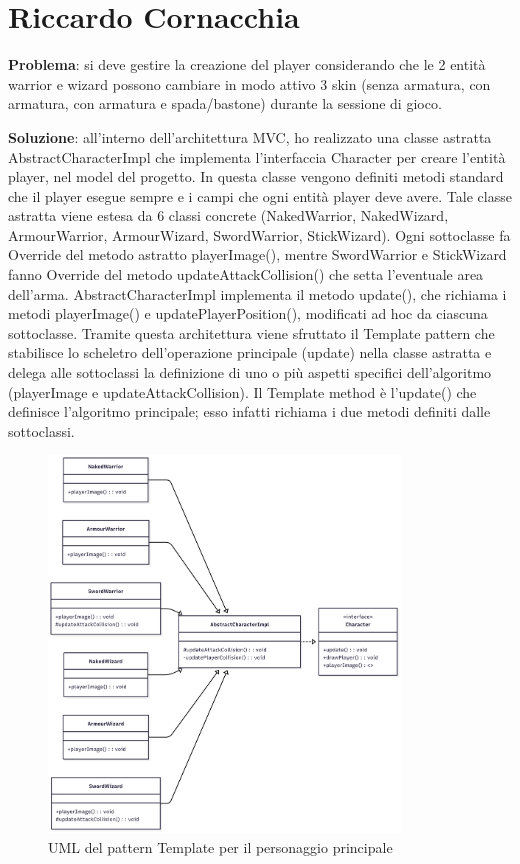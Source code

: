 \documentclass[a4paper,12pt]{report}
\begin{document}
\section{Riccardo Cornacchia}

\textbf{Problema}: si deve gestire la creazione del player considerando che le 2 entità warrior e wizard possono cambiare in modo attivo 3 skin
(senza armatura, con armatura, con armatura e spada/bastone) durante la sessione di gioco.

\textbf{Soluzione}: all'interno dell'architettura MVC, ho realizzato una classe astratta AbstractCharacterImpl che implementa l'interfaccia 
Character per creare l'entità player, nel model del progetto. In questa classe vengono definiti metodi standard che il player esegue sempre 
e i campi che ogni entità player deve avere.
Tale classe astratta viene estesa da 6 classi concrete (NakedWarrior, NakedWizard, ArmourWarrior, ArmourWizard, SwordWarrior, 
StickWizard). Ogni sottoclasse fa Override del metodo astratto playerImage(), mentre SwordWarrior e StickWizard fanno Override 
del metodo updateAttackCollision() che setta l'eventuale area dell'arma.
AbstractCharacterImpl implementa il metodo update(), che richiama i metodi playerImage() e updatePlayerPosition(), modificati ad hoc 
da ciascuna sottoclasse. Tramite questa architettura viene sfruttato il Template pattern che stabilisce lo scheletro dell'operazione 
principale (update) nella classe astratta e delega alle sottoclassi la definizione di uno o più aspetti specifici dell'algoritmo 
(playerImage e updateAttackCollision). Il Template method è l'update() che definisce l'algoritmo principale; esso infatti richiama i due 
metodi definiti dalle sottoclassi.

\begin{figure}[H]
    \centering
    \includegraphics[width=\textwidth, height=10cm]{resources/TemplateCharacter.png}
    \caption{UML del pattern Template per il personaggio principale}
    \label{fig:2.1}
\end{figure}
\end{document}
